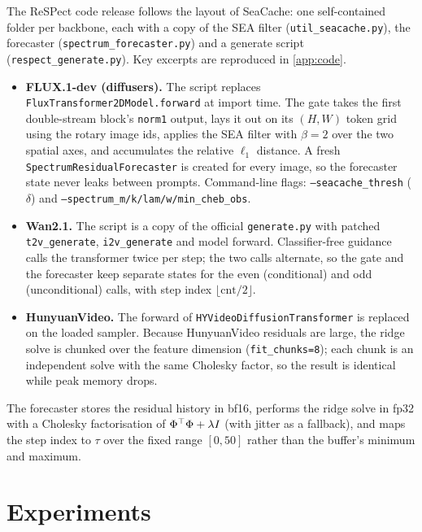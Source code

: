 The ReSPect code release follows the layout of SeaCache: one self-contained folder per backbone, each with a copy of the SEA filter (\texttt{util\_seacache.py}), the forecaster (\texttt{spectrum\_forecaster.py}) and a generate script (\texttt{respect\_generate.py}). Key excerpts are reproduced in \cref{app:code}.
\begin{itemize}
  \item \textbf{FLUX.1-dev (diffusers).} The script replaces \texttt{FluxTransformer2DModel.forward} at import time. The gate takes the first double-stream block's \texttt{norm1} output, lays it out on its $(H,W)$ token grid using the rotary image ids, applies the SEA filter with $\beta=2$ over the two spatial axes, and accumulates the relative $\ell_1$ distance. A fresh \texttt{SpectrumResidualForecaster} is created for every image, so the forecaster state never leaks between prompts. Command-line flags: \texttt{--seacache\_thresh} ($\delta$) and \texttt{--spectrum\_m/k/lam/w/min\_cheb\_obs}.
  \item \textbf{Wan2.1.} The script is a copy of the official \texttt{generate.py} with patched \texttt{t2v\_generate}, \texttt{i2v\_generate} and model forward. Classifier-free guidance calls the transformer twice per step; the two calls alternate, so the gate and the forecaster keep separate states for the even (conditional) and odd (unconditional) calls, with step index $\lfloor\mathrm{cnt}/2\rfloor$.
  \item \textbf{HunyuanVideo.} The forward of \texttt{HYVideoDiffusionTransformer} is replaced on the loaded sampler. Because HunyuanVideo residuals are large, the ridge solve is chunked over the feature dimension (\texttt{fit\_chunks=8}); each chunk is an independent solve with the same Cholesky factor, so the result is identical while peak memory drops.
\end{itemize}
The forecaster stores the residual history in bf16, performs the ridge solve in fp32 with a Cholesky factorisation of $\Phi^{\top}\Phi+\lambda I$ (with jitter as a fallback), and maps the step index to $\tau$ over the fixed range $[0,50]$ rather than the buffer's minimum and maximum.

\section{Experiments}\label{sec:respect-exp}

